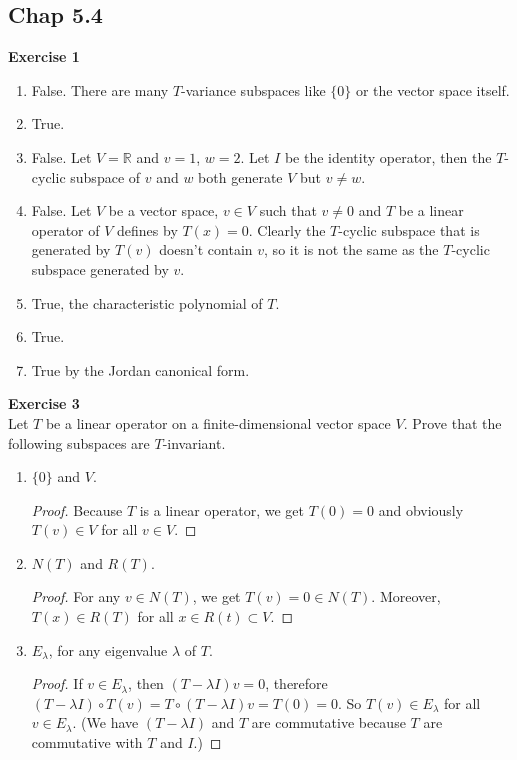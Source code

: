 \documentclass[12pt, a4paper]{article}
\theoremstyle{plain}
\newcommand{\R}{\mathbb{R}}
\newenvironment{exercise}[2][Exercise]
    { \begin{mdframed}[backgroundcolor=gray!20] \textbf{#1 #2} \\}
    {  \end{mdframed}}
\begin{document}
\subsection*{Chap 5.4}
\begin{exercise}{1}
\hfill

\begin{enumerate}[label=(\alph*)]
\item False. There are many $T$-variance subspaces like $\{0\}$ or the vector space itself.
\item True.
\item False. Let $V=\R$ and $v=1$, $w=2$. Let $I$ be the identity operator, then the $T$-cyclic subspace of $v$ and $w$ both generate $V$ but $v\neq w$.
\item False. Let $V$ be a vector space, $v\in V$ such that $v\neq 0$ and $T$ be a linear operator of $V$ defines by $T(x)=0$. Clearly the $T$-cyclic subspace that is generated by $T(v)$ doesn't contain $v$, so it is not the same as the $T$-cyclic subspace generated by $v$.
\item True, the characteristic polynomial of $T$.
\item True.
\item True by the Jordan canonical form.
\end{enumerate}
\end{exercise}

\begin{exercise}{3}
Let $T$ be a linear operator on a finite-dimensional vector space $V$. Prove that the following subspaces are $T$-invariant.
\begin{enumerate}[label=(\alph*)]
\item $\{0\}$ and $V$.
	\begin{proof}
	Because $T$ is a linear operator, we get $T(0)=0$ and obviously $T(v)\in V$ for all $v\in V$.
	\end{proof}

\item $N(T)$ and $R(T)$.
	\begin{proof}
	For any $v\in N(T)$, we get $T(v)=0\in N(T)$. Moreover, $T(x)\in R(T)$ for all $x\in R(t)\subset V$. 
	\end{proof}

\item $E_\lambda$, for any eigenvalue $\lambda$ of $T$.
	\begin{proof}
	If $v\in E_\lambda$, then $(T-\lambda I)v=0$, therefore $(T-\lambda I)\circ T(v)=T\circ (T-\lambda I)v=T(0)=0$. So $T(v)\in E_\lambda$ for all $v\in E_\lambda$. (We have $(T-\lambda I)$ and $T$ are commutative because $T$ are commutative with $T$ and $I$.)
	\end{proof}
\end{enumerate}
\end{exercise}
\end{document}
